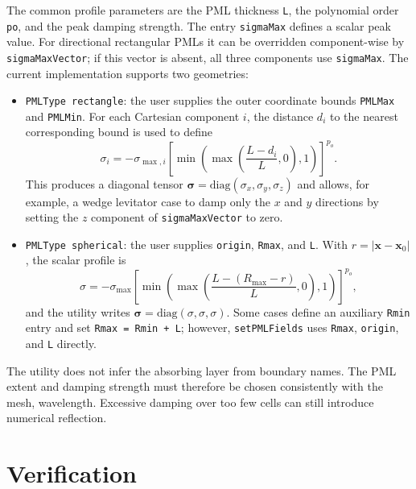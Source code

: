 \documentclass[final,num,12pt]{elsarticle}
\begin{document}
The common profile parameters are the PML thickness \texttt{L}, the polynomial
order \texttt{po}, and the peak damping strength.  The entry \texttt{sigmaMax}
defines a scalar peak value.  For directional rectangular PMLs it can be
overridden component-wise by \texttt{sigmaMaxVector}; if this vector is absent,
all three components use \texttt{sigmaMax}.  The current implementation supports
two geometries:
\begin{itemize}
    \item \texttt{PMLType rectangle}: the user supplies the outer coordinate
    bounds \texttt{PMLMax} and \texttt{PMLMin}.  For each Cartesian component
    $i$, the distance $d_i$ to the nearest corresponding bound is used to define
    \begin{equation}
        \sigma_i
        =
        -\sigma_{\max,i}
        \left[
        \min\left(\max\left(\frac{L-d_i}{L},0\right),1\right)
        \right]^{p_o}.
    \end{equation}
    This produces a diagonal tensor
    $\boldsymbol{\sigma}=\mathrm{diag}(\sigma_x,\sigma_y,\sigma_z)$ and allows,
    for example, a wedge levitator case to damp only the $x$ and $y$ directions
    by setting the $z$ component of \texttt{sigmaMaxVector} to zero.

    \item \texttt{PMLType spherical}: the user supplies \texttt{origin},
    \texttt{Rmax}, and \texttt{L}.  With $r=|\mathbf{x}-\mathbf{x}_0|$, the
    scalar profile is
    \begin{equation}
        \sigma
        =
        -\sigma_{\max}
        \left[
        \min\left(\max\left(\frac{L-(R_{\max}-r)}{L},0\right),1\right)
        \right]^{p_o},
    \end{equation}
    and the utility writes
    $\boldsymbol{\sigma}=\mathrm{diag}(\sigma,\sigma,\sigma)$.  Some cases define
    an auxiliary \texttt{Rmin} entry and set \texttt{Rmax = Rmin + L}; however,
    \texttt{setPMLFields} uses \texttt{Rmax}, \texttt{origin}, and \texttt{L}
    directly.
\end{itemize}

The utility does not infer the absorbing layer from boundary names.  The PML
extent and damping strength must therefore be chosen consistently with the mesh,
wavelength.  Excessive damping over too
few cells can still introduce numerical reflection.

\section{Verification}
\label{sec:verification}
\end{document}
